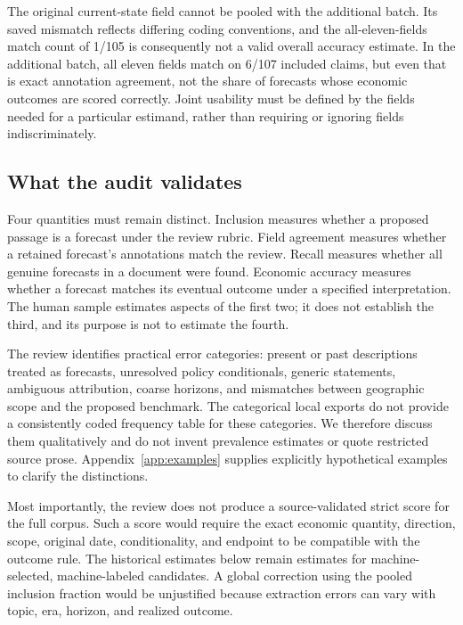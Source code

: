 The original current-state field cannot be pooled with the additional batch. Its saved mismatch reflects differing coding conventions, and the all-eleven-fields match count of 1/105 is consequently not a valid overall accuracy estimate. In the additional batch, all eleven fields match on 6/107 included claims, but even that is exact annotation agreement, not the share of forecasts whose economic outcomes are scored correctly. Joint usability must be defined by the fields needed for a particular estimand, rather than requiring or ignoring fields indiscriminately.

\subsection{What the audit validates}
Four quantities must remain distinct. Inclusion measures whether a proposed passage is a forecast under the review rubric. Field agreement measures whether a retained forecast's annotations match the review. Recall measures whether all genuine forecasts in a document were found. Economic accuracy measures whether a forecast matches its eventual outcome under a specified interpretation. The human sample estimates aspects of the first two; it does not establish the third, and its purpose is not to estimate the fourth.

The review identifies practical error categories: present or past descriptions treated as forecasts, unresolved policy conditionals, generic statements, ambiguous attribution, coarse horizons, and mismatches between geographic scope and the proposed benchmark. The categorical local exports do not provide a consistently coded frequency table for these categories. We therefore discuss them qualitatively and do not invent prevalence estimates or quote restricted source prose. Appendix~\ref{app:examples} supplies explicitly hypothetical examples to clarify the distinctions.

Most importantly, the review does not produce a source-validated strict score for the full corpus. Such a score would require the exact economic quantity, direction, scope, original date, conditionality, and endpoint to be compatible with the outcome rule. The historical estimates below remain estimates for machine-selected, machine-labeled candidates. A global correction using the pooled inclusion fraction would be unjustified because extraction errors can vary with topic, era, horizon, and realized outcome.

